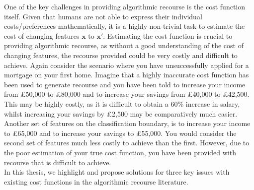 One of the key challenges in providing algorithmic recourse is the cost function itself. Given that humans are not able to express their individual costs/preferences mathematically, it is a highly non-trivial task to estimate the cost of changing features $\mathbf{x}$ to  $\mathbf{x}'$. Estimating the cost function is crucial to providing algorithmic recourse, as without a good understanding of the cost of changing features, the recourse provided could be very costly and difficult to achieve. Again consider the scenario where you have unsuccessfully applied for a mortgage on your first home. Imagine that a highly inaccurate cost function has been used to generate recourse and you have been told to increase your income from £50,000 to £80,000 and to increase your savings from £40,000 to £42,500. This may be highly costly, as it is difficult to obtain a 60\% increase in salary, whilst increasing your savings by £2,500 may be comparatively much easier. Another set of features on the classification boundary, is to increase your income to £65,000 and to increase your savings to £55,000. You would consider the second set of features much less costly to achieve than the first. However, due to the poor estimation of your true cost function, you have been provided with recourse that is difficult to achieve.\\

In this thesis, we highlight and propose solutions for three key issues with existing cost functions in the algorithmic recourse literature.


